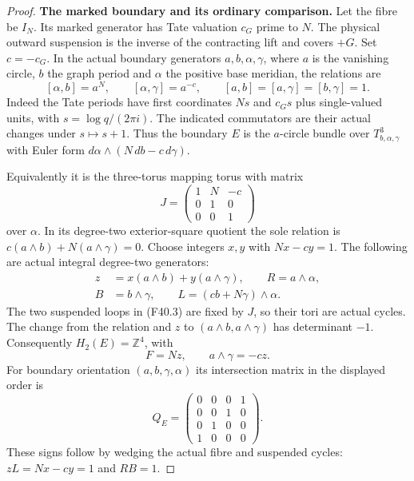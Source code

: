 \begin{proof}
\par\medskip\noindent\textbf{The marked boundary and its ordinary comparison.}
Let the fibre be $I_N$. Its marked generator has Tate valuation
$c_G$ prime to $N$. The physical outward suspension is the
inverse of the contracting lift and covers $+G$. Set $c=-c_G$.
In the actual boundary generators $a,b,\alpha,\gamma$, where
$a$ is the vanishing circle, $b$ the graph period and $\alpha$
the positive base meridian, the relations are
\[
 [\alpha,b]=a^N,\qquad[\alpha,\gamma]=a^{-c},\qquad
 [a,b]=[a,\gamma]=[b,\gamma]=1.                       \tag{F40.2}
\]
Indeed the Tate periods have first coordinates $Ns$ and
$c_Gs$ plus single-valued units, with $s=\log q/(2\pi i)$.
The indicated commutators are their actual changes under
$s\mapsto s+1$. Thus the boundary $E$ is the $a$-circle bundle
over $T^3_{b,\alpha,\gamma}$ with Euler form
$d\alpha\wedge(N\,db-c\,d\gamma)$.

Equivalently it is the three-torus mapping torus with matrix
\[
 J=\begin{pmatrix}1&N&-c\\0&1&0\\0&0&1\end{pmatrix}
\]
over $\alpha$. In its degree-two exterior-square quotient the
sole relation is
$c(a\wedge b)+N(a\wedge\gamma)=0$.
Choose integers $x,y$ with $Nx-cy=1$. The following are
actual integral degree-two generators:
\[
 \begin{split}
 z&=x(a\wedge b)+y(a\wedge\gamma),\qquad
 R=a\wedge\alpha,\\
 B&=b\wedge\gamma,\qquad
 L=(cb+N\gamma)\wedge\alpha.
 \end{split}                                                \tag{F40.3}
\]
The two suspended loops in (F40.3) are fixed by $J$, so their
tori are actual cycles. The change from the relation and $z$
to $(a\wedge b,a\wedge\gamma)$ has determinant $-1$.
Consequently $H_2(E)=\mathbb Z^4$, with
\[
 F=Nz,\qquad a\wedge\gamma=-cz.
\]
For boundary orientation $(a,b,\gamma,\alpha)$ its intersection
matrix in the displayed order is
\[
 Q_E=\begin{pmatrix}0&0&0&1\\0&0&1&0\\0&1&0&0\\1&0&0&0
 \end{pmatrix}.                                           \tag{F40.4}
\]
These signs follow by wedging the actual fibre and suspended
cycles: $zL=Nx-cy=1$ and $RB=1$.


\end{proof}
